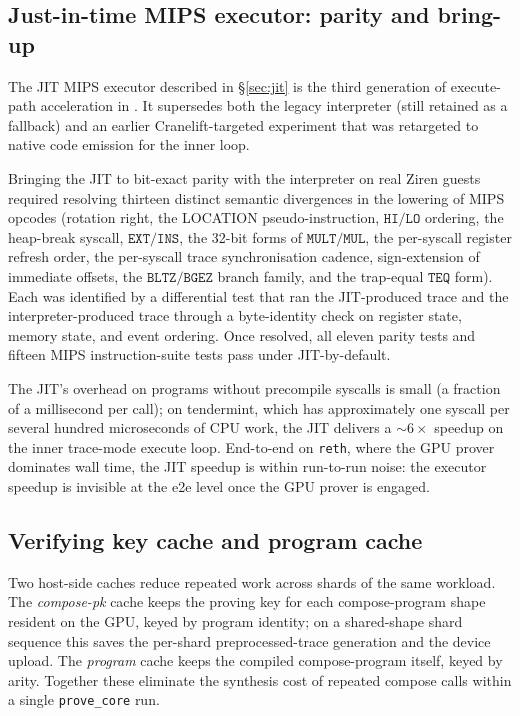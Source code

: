 \subsection{Just-in-time MIPS executor: parity and bring-up}
\label{sec:jit-bringup}

The JIT MIPS executor described in \S\ref{sec:jit} is the third generation of execute-path acceleration in \Ziren{}. It supersedes both the legacy interpreter (still retained as a fallback) and an earlier Cranelift-targeted experiment that was retargeted to native code emission for the inner loop.

Bringing the JIT to bit-exact parity with the interpreter on real Ziren guests required resolving thirteen distinct semantic divergences in the lowering of MIPS opcodes (rotation right, the LOCATION pseudo-instruction, $\mathtt{HI}/\mathtt{LO}$ ordering, the heap-break syscall, $\mathtt{EXT}/\mathtt{INS}$, the 32-bit forms of $\mathtt{MULT}/\mathtt{MUL}$, the per-syscall register refresh order, the per-syscall trace synchronisation cadence, sign-extension of immediate offsets, the $\mathtt{BLTZ}/\mathtt{BGEZ}$ branch family, and the trap-equal $\mathtt{TEQ}$ form). Each was identified by a differential test that ran the JIT-produced trace and the interpreter-produced trace through a byte-identity check on register state, memory state, and event ordering. Once resolved, all eleven parity tests and fifteen MIPS instruction-suite tests pass under JIT-by-default.

The JIT's overhead on programs without precompile syscalls is small (a fraction of a millisecond per call); on tendermint, which has approximately one syscall per several hundred microseconds of CPU work, the JIT delivers a $\sim$$6\times$ speedup on the inner trace-mode execute loop. End-to-end on \texttt{reth}, where the GPU prover dominates wall time, the JIT speedup is within run-to-run noise: the executor speedup is invisible at the e2e level once the GPU prover is engaged.

\subsection{Verifying key cache and program cache}

Two host-side caches reduce repeated work across shards of the same workload.  The \emph{compose-pk} cache keeps the proving key for each compose-program shape resident on the GPU, keyed by program identity; on a shared-shape shard sequence this saves the per-shard preprocessed-trace generation and the device upload. The \emph{program} cache keeps the compiled compose-program itself, keyed by arity. Together these eliminate the synthesis cost of repeated compose calls within a single \texttt{prove\_core} run.

